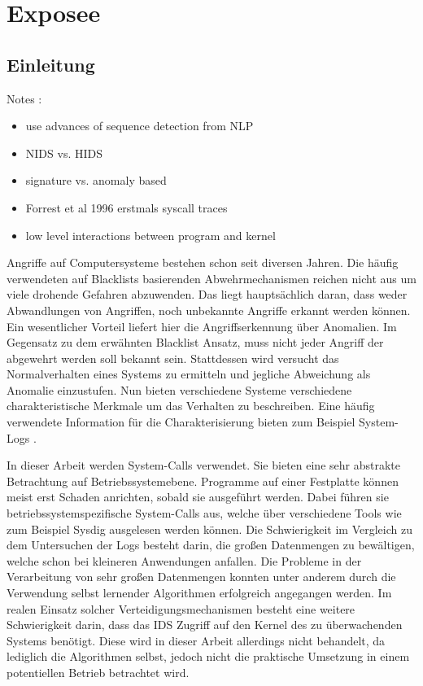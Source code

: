 \chapter{Exposee}\label{ch:introduction}
\section{Einleitung}
Notes :

\begin{itemize}
    \item use advances of sequence detection from NLP
    \item NIDS vs. HIDS
    \item signature vs. anomaly based
    \item Forrest et al 1996 erstmals syscall traces
    \item low level interactions between program and kernel
\end{itemize}

Angriffe auf Computersysteme bestehen schon seit diversen Jahren. 
Die häufig verwendeten auf Blacklists basierenden Abwehrmechanismen reichen nicht aus um viele drohende Gefahren abzuwenden.
Das liegt hauptsächlich daran, dass weder Abwandlungen von Angriffen, noch unbekannte Angriffe erkannt werden können.
Ein wesentlicher Vorteil liefert hier die Angriffserkennung über Anomalien.
Im Gegensatz zu dem erwähnten Blacklist Ansatz, muss nicht jeder Angriff der abgewehrt werden soll bekannt sein.
Stattdessen wird versucht das Normalverhalten eines Systems zu ermitteln und jegliche Abweichung als Anomalie einzustufen.
Nun bieten verschiedene Systeme verschiedene charakteristische Merkmale um das Verhalten zu beschreiben. 
Eine häufig verwendete Information für die Charakterisierung bieten zum Beispiel System-Logs \cite{HE}.

In dieser Arbeit werden System-Calls verwendet.
Sie bieten eine sehr abstrakte Betrachtung auf Betriebssystemebene.
Programme auf einer Festplatte können meist erst Schaden anrichten, sobald sie ausgeführt werden.
Dabei führen sie betriebssystemspezifische System-Calls aus, welche über verschiedene Tools wie zum Beispiel Sysdig \cite{SYSDIG} ausgelesen werden können.
Die Schwierigkeit im Vergleich zu dem Untersuchen der Logs besteht darin, die großen Datenmengen zu bewältigen, welche schon bei kleineren Anwendungen anfallen.
Die Probleme in der Verarbeitung von sehr großen Datenmengen konnten unter anderem durch die Verwendung selbst lernender Algorithmen erfolgreich angegangen werden.
Im realen Einsatz solcher Verteidigungsmechanismen besteht eine weitere Schwierigkeit darin, dass das IDS Zugriff auf den Kernel des zu überwachenden Systems benötigt.
Diese wird in dieser Arbeit allerdings nicht behandelt, da lediglich die Algorithmen selbst, jedoch nicht die praktische Umsetzung in einem potentiellen Betrieb betrachtet wird.

